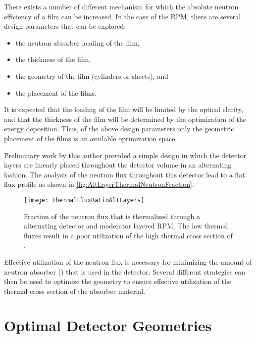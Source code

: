 There exists a number of different mechanism for which the absolute neutron efficiency of a film can be increased.
In the case of the RPM, there are several design parameters that can be explored:
\begin{itemize}
  \item the neutron absorber loading of the film,
  \item the thickness of the film,
  \item the geometry of the film (cylinders or sheets), and
  \item the placement of the films.
\end{itemize}
It is expected that the loading of the film will be limited by the optical clarity, and that the thickness of the film will be determined by the optimization of the energy deposition.
Thus, of the above design parameters only the geometric placement of the films is an available optimization space.

Preliminary work by this author provided a simple design in which the detector layers are linearly placed throughout the detector volume in an alternating fashion.
The analysis of the neutron flux throughout this detector lead to a flat flux profile as shown in \autoref{fig:AltLayerThermalNeutronFraction}.
\begin{figure}
  \texttt{[image: ThermalFluxRatioAltLayers]}
	\caption{Fraction of the neutron flux that is thermalized through a alternating detector and moderator layered RPM.  The low thermal fluxes result in a poor utilization of the high thermal cross section of .}
	\label{fig:AltLayerThermalNeutronFraction}
\end{figure}
Effective utilization of the neutron flux is necessary for minimizing the amount of neutron absorber () that is used in the detector.
Several different strategies can then be used to optimize the geometry to ensure effective utilization of the thermal cross section of the absorber material.

\section{Optimal Detector Geometries}

